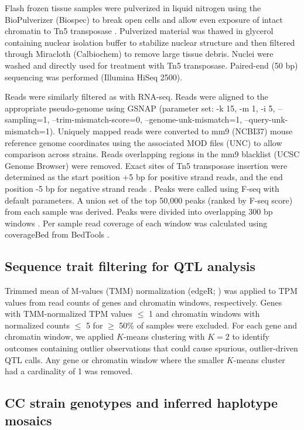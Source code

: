 \documentclass[10pt,letterpaper]{article}
\begin{document}
Flash frozen tissue samples were pulverized in liquid nitrogen using the BioPulverizer (Biospec) to break open cells and allow even exposure of intact chromatin to Tn5 transposase \cite{Buenrostro2015}. Pulverized material was thawed in glycerol containing nuclear isolation buffer to stabilize nuclear structure and then filtered through Miracloth (Calbiochem) to remove large tissue debris. Nuclei were washed and directly used for treatment with Tn5 transposase. Paired-end (50 bp) sequencing was performed (Illumina HiSeq 2500).

Reads were similarly filtered as with RNA-seq. Reads were aligned to the appropriate pseudo-genome using GSNAP (parameter set: -k 15, -m 1, -i 5, –sampling=1, –trim-mismatch-score=0, –genome-unk-mismatch=1, –query-unk-mismatch=1). Uniquely mapped reads were converted to mm9 (NCBI37) mouse reference genome coordinates using the associated MOD files (UNC) to allow comparison across strains. Reads overlapping regions in the mm9 blacklist (UCSC Genome Browser) were removed. Exact sites of Tn5 transposase insertion were determined as the start position +5 bp for positive strand reads, and the end position -5 bp for negative strand reads \cite{Buenrostro2013}. Peaks were called using F-seq with default parameters. A union set of the top 50,000 peaks (ranked by F-seq score) from each sample was derived. Peaks were divided into overlapping 300 bp windows \cite{Shibata2012}. Per sample read coverage of each window was calculated using coverageBed from BedTools \cite{Quinlan2010}.

\subsection*{Sequence trait filtering for QTL analysis}

Trimmed mean of M-values (TMM) normalization (edgeR; \cite{edgeR}) was applied to TPM values from read counts of genes and chromatin windows, respectively. Genes with TMM-normalized TPM values $\leq$ 1 and chromatin windows with normalized counts $\leq$ 5 for $\geq$ 50\% of samples were excluded. For each gene and chromatin window, we applied $K$-means clustering with $K=2$ to identify outcomes containing outlier observations that could cause spurious, outlier-driven QTL calls. Any gene or chromatin window where the smaller $K$-means cluster had a cardinality of 1 was removed.

\subsection*{CC strain genotypes and inferred haplotype mosaics}
\end{document}
